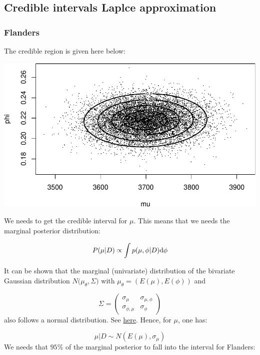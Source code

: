 \documentclass[a4paper, 12pt]{article}
\begin{document}
    \hypertarget{credible-intervals-laplce-approximation}{%
    \subsection{Credible intervals Laplce
    approximation}\label{credible-intervals-laplce-approximation}}

    \hypertarget{flanders-1}{%
    \subsubsection{Flanders}\label{flanders-1}}

    The credible region is given here below:

    \begin{center}\includegraphics[width=0.8\linewidth]{resources/figs/unnamed-chunk-11-1} \end{center}

    We needs to get the credible interval for \(\mu\). This means that
    we needs the marginal posterior distribution:

    \[
    P(\mu| D) \propto \int p(\mu, \phi |D) \mathrm{d} \phi
    \]

    It can be shown that the marginal (univariate) distribution of the
    bivariate Gaussian distribution \(N\big( \mu_\theta, \Sigma)\) with
    \(\mu_\theta = (E(\mu), E(\phi) )\) and

    \[
    \Sigma =
    \begin{pmatrix}
    \sigma_\mu & \sigma_{\mu,\phi} \\
    \sigma_{\phi,\mu} & \sigma_\phi
    \end{pmatrix}
    \] also follows a normal distribution. See
    \href{https://paolomaccallini.com/2018/06/20/bivariate-normal-distribution/}{here}.
    Hence, for \(\mu\), one has:

    \[\mu|D \sim N(E(\mu),\sigma_\mu) \] We needs that \(95\%\) of the
    marginal posterior to fall into the interval for Flanders:
\end{document}
